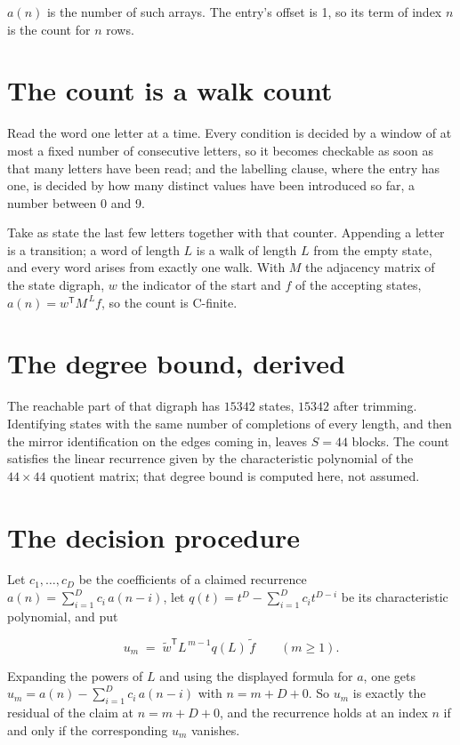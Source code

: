 \documentclass[11pt]{article}
\theoremstyle{definition}
\begin{document}
$a(n)$ is the number of such arrays. The entry's offset is 1, so its term of index $n$ is the count for $n$ rows.

\section{The count is a walk count}

Read the word one letter at a time. Every condition is decided by a window of at most a fixed number of consecutive letters, so it becomes checkable as soon as that many letters have been read; and the labelling clause, where the entry has one, is decided by how many distinct values have been introduced so far, a number between $0$ and 9.

Take as state the last few letters together with that counter. Appending a letter is a transition; a word of length $L$ is a walk of length $L$ from the empty state, and every word arises from exactly one walk. With $M$ the adjacency matrix of the state digraph, $w$ the indicator of the start and $f$ of the accepting states, $a(n) = w^{\mathsf T}M^{\,L}f$, so the count is C-finite.

\section{The degree bound, derived}

The reachable part of that digraph has $15342$ states, $15342$ after trimming. Identifying states with the same number of completions of every length, and then the mirror identification on the edges coming in, leaves $S = 44$ blocks. The count satisfies the linear recurrence given by the characteristic polynomial of the $44\times44$ quotient matrix; that degree bound is computed here, not assumed.

\section{The decision procedure}

Let $c_1,\dots,c_D$ be the coefficients of a claimed recurrence $a(n) = \sum_{i=1}^{D} c_i\,a(n-i)$, let $q(t) = t^{D} - \sum_{i=1}^{D} c_i t^{D-i}$ be its characteristic polynomial, and put

\[u_m \;=\; \tilde w^{\mathsf T} L^{\,m-1} q(L)\,\tilde f \qquad (m \ge 1).\]

Expanding the powers of $L$ and using the displayed formula for $a$, one gets $u_m = a(n) - \sum_{i=1}^{D} c_i\,a(n-i)$ with $n = m + D + 0$. So $u_m$ is exactly the residual of the claim at $n = m + D + 0$, and the recurrence holds at an index $n$ if and only if the corresponding $u_m$ vanishes.
\end{document}

